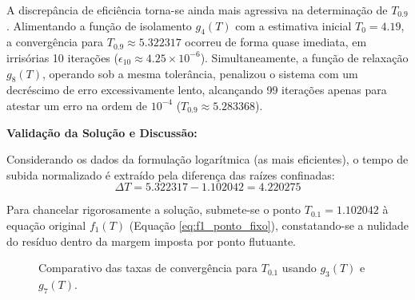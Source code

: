 A discrepância de eficiência torna-se ainda mais agressiva na determinação de $T_{0.9}$. Alimentando a função de isolamento $g_4(T)$ com a estimativa inicial $T_0 = 4.19$, a convergência para $T_{0.9} \approx 5.322317$ ocorreu de forma quase imediata, em irrisórias 10 iterações ($\epsilon_{10} \approx 4.25 \times 10^{-6}$). Simultaneamente, a função de relaxação $g_8(T)$, operando sob a mesma tolerância, penalizou o sistema com um decréscimo de erro excessivamente lento, alcançando 99 iterações apenas para atestar um erro na ordem de $10^{-4}$ ($T_{0.9} \approx 5.283368$).

\textbf{Validação da Solução e Discussão:}

Considerando os dados da formulação logarítmica (as mais eficientes), o tempo de subida normalizado é extraído pela diferença das raízes confinadas:
\begin{equation}
    \Delta T = 5.322317 - 1.102042 = 4.220275
\end{equation}

Para chancelar rigorosamente a solução, submete-se o ponto $T_{0.1} = 1.102042$ à equação original $f_1(T)$ (Equação \ref{eq:f1_ponto_fixo}), constatando-se a nulidade do resíduo dentro da margem imposta por ponto flutuante. 

\begin{figure}[H]
    \centering
    \caption{Comparativo das taxas de convergência para $T_{0.1}$ usando $g_3(T)$ e $g_7(T)$.}
    \label{fig:convergencia_ponto_fixo_amplificador_comparativo}
\end{figure}

